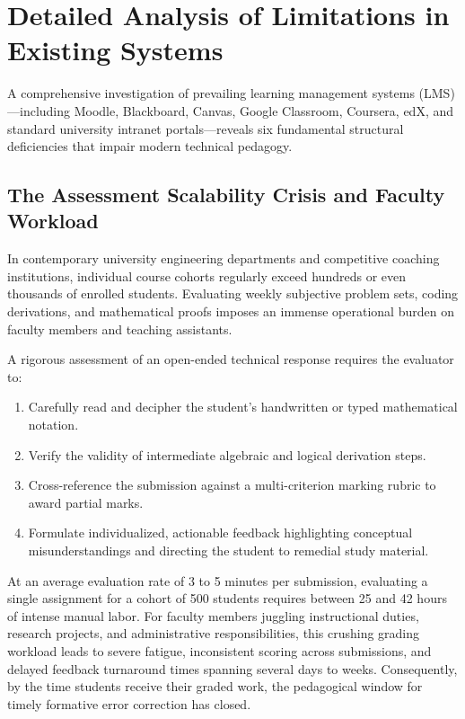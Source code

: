 \section{Detailed Analysis of Limitations in Existing Systems}
A comprehensive investigation of prevailing learning management systems (LMS)—including Moodle, Blackboard, Canvas, Google Classroom, Coursera, edX, and standard university intranet portals—reveals six fundamental structural deficiencies that impair modern technical pedagogy.

\subsection{The Assessment Scalability Crisis and Faculty Workload}
In contemporary university engineering departments and competitive coaching institutions, individual course cohorts regularly exceed hundreds or even thousands of enrolled students. Evaluating weekly subjective problem sets, coding derivations, and mathematical proofs imposes an immense operational burden on faculty members and teaching assistants. 

A rigorous assessment of an open-ended technical response requires the evaluator to:
\begin{enumerate}[leftmargin=*]
    \item Carefully read and decipher the student's handwritten or typed mathematical notation.
    \item Verify the validity of intermediate algebraic and logical derivation steps.
    \item Cross-reference the submission against a multi-criterion marking rubric to award partial marks.
    \item Formulate individualized, actionable feedback highlighting conceptual misunderstandings and directing the student to remedial study material.
\end{enumerate}

At an average evaluation rate of 3 to 5 minutes per submission, evaluating a single assignment for a cohort of 500 students requires between 25 and 42 hours of intense manual labor. For faculty members juggling instructional duties, research projects, and administrative responsibilities, this crushing grading workload leads to severe fatigue, inconsistent scoring across submissions, and delayed feedback turnaround times spanning several days to weeks. Consequently, by the time students receive their graded work, the pedagogical window for timely formative error correction has closed.


